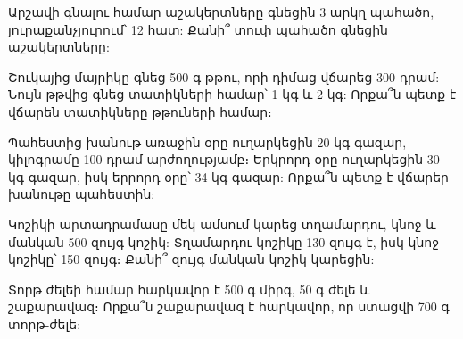 \problem
Արշավի գնալու համար աշակերտները գնեցին 3 արկղ պահածո, յուրաքանչյուրում՝ 
12 հատ: Քանի՞ տուփ պահածո գնեցին աշակերտները:

\problem
Շուկայից մայրիկը գնեց 500 գ թթու, որի դիմաց վճարեց 300 դրամ: Նույն 
թթվից գնեց տատիկների համար՝ 1 կգ և 2 կգ: Որքա՞ն պետք է վճարեն 
տատիկները թթուների համար։

\problem
Պահեստից խանութ առաջին օրը ուղարկեցին 20 կգ գազար, կիլոգրամը 100 
դրամ արժողությամբ։ Երկրորդ օրը ուղարկեցին 30 կգ գազար, իսկ երրորդ 
օրը՝ 34 կգ գազար: Որքա՞ն պետք է վճարեր խանութը պահեստին:

\problem
Կոշիկի արտադրամասը մեկ ամսում կարեց տղամարդու, կնոջ և մանկան 500 
զույգ կոշիկ: Տղամարդու կոշիկը 130 զույգ է, իսկ կնոջ կոշիկը՝ 150 
զույգ։ Քանի՞ զույգ մանկան կոշիկ կարեցին:

\problem
Տորթ ժելեի համար հարկավոր է 500 գ միրգ, 50 գ ժելե և շաքարավազ։ 
Որքա՞ն շաքարավազ է հարկավոր, որ ստացվի 700 գ տորթ-ժելե:

\solution

\bye
